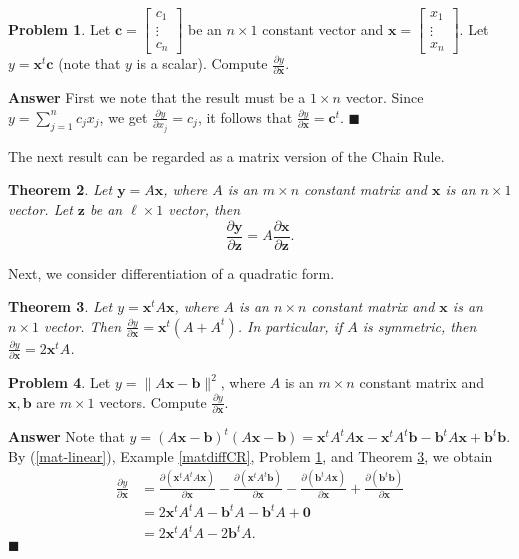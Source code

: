 \documentclass[12pt,letterpaper]{book}
\numberwithin{equation}{section}
\newtheorem{thm}{\textbf{Theorem}}[section]
\theoremstyle{definition}
\newtheorem{problem}[thm]{\textbf{Problem}}
\newenvironment{answer}{\noindent\textbf{Answer}}{\hfill$\blacksquare$\vspace{0.1in}}
\newcommand{\vx}{\bm{x}}
\newcommand{\vy}{\bm{y}}
\newcommand{\vz}{\bm{z}}
\newcommand{\vb}{\bm{b}}
\begin{document}
\begin{problem}\label{xtranc}
Let $\bm{c}=\left[\begin{array}{c} c_1 \\ \vdots \\ c_n \end{array}\right]$ be an $n\times 1$ constant vector and $\vx=\left[\begin{array}{c} x_1 \\ \vdots \\ x_n \end{array}\right]$. Let $y=\vx^t\bm{c}$ (note that $y$ is a scalar). Compute $\frac{\partial y}{\partial \vx}$.
\end{problem}

\begin{answer} First we note that the result must be a $1\times n$ vector. Since $y=\sum_{j=1}^n c_jx_j$, we get $\frac{\partial y}{\partial x_j}=c_j$, it follows that $\frac{\partial y}{\partial \vx}=\bm{c}^t$.
\end{answer}

The next result can be regarded as a matrix version of the Chain Rule.

\begin{thm}
Let $\vy=A\vx$, where $A$ is an $m\times n$ constant matrix and $\vx$ is an $n\times 1$ vector. Let $\vz$ be an $\ell\times 1$ vector, then
$$\frac{\partial \vy}{\partial \vz}=A\frac{\partial \vx}{\partial \vz}.$$
\end{thm}

Next, we consider differentiation of a quadratic form.

\begin{thm}\label{Ainside}
Let $y=\vx^tA\vx$, where $A$ is an $n\times n$ constant matrix and $\vx$ is an $n\times 1$ vector. Then $\frac{\partial y}{\partial \vx}=\vx^t(A+A^t)$. In particular, if $A$ is symmetric, then $\frac{\partial y}{\partial \vx}=2\vx^tA$.
\end{thm}

\begin{problem}\label{normdiff}
Let $y=\|A\vx -\vb\|^2$, where $A$ is an $m\times n$ constant matrix and $\vx, \vb$ are $m\times 1$ vectors. Compute $\frac{\partial y}{\partial \vx}$.
\end{problem}

\begin{answer}
Note that $y=(A\vx-\vb)^t(A\vx-\vb)=\vx^tA^tA\vx-\vx^tA^t\vb-\vb^tA\vx+\vb^t\vb$.  By (\ref{mat-linear}), Example \ref{matdiffCR}, Problem \ref{xtranc}, and Theorem \ref{Ainside}, we obtain
\begin{align*}
\frac{\partial y}{\partial \vx}&=\frac{\partial (\vx^tA^tA\vx)}{\partial \vx}-\frac{\partial(\vx^tA^t\vb)}{\partial \vx}-\frac{\partial(\vb^tA\vx)}{\partial \vx}+\frac{\partial (\vb^t\vb)}{\partial \vx}\\
&=2\vx^tA^tA-\vb^t A-\vb^tA+\bm{0}\\
&=2\vx^tA^tA-2\vb^t A.
\end{align*}
\end{answer}
\end{document}
